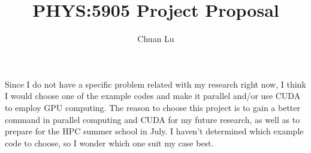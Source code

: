 \documentclass{article}
\begin{document}
\author{Chuan Lu}
\title{PHYS:5905 Project Proposal}
\maketitle

\medskip

Since I do not have a specific problem related with my research right now, I think I would choose one of the example codes and make it parallel and/or use CUDA to employ GPU computing. The reason to choose this project is to gain a better command in parallel computing and CUDA for my future research, as well as to prepare for the HPC summer school in July. I haven't determined which example code to choose, so I wonder which one suit my case best. 
\end{document}
